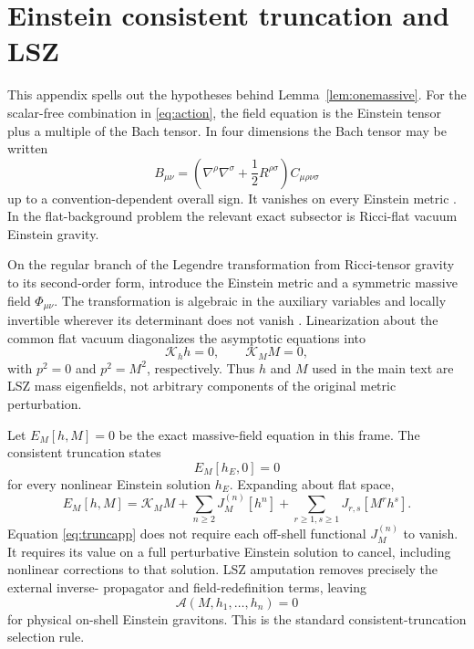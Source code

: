 \documentclass[11pt]{article}
\theoremstyle{definition}
\theoremstyle{remark}
\begin{document}
\appendix

\section{Einstein consistent truncation and LSZ}
\label{app:truncation}

This appendix spells out the hypotheses behind
Lemma~\ref{lem:onemassive}.  For the scalar-free combination in
\eqref{eq:action}, the field equation is the Einstein tensor plus a
multiple of the Bach tensor.  In four dimensions the Bach tensor may be
written
\begin{equation}
B_{\mu\nu}=\left(\nabla^\rho\nabla^\sigma
+\frac12R^{\rho\sigma}\right)C_{\mu\rho\nu\sigma}
\end{equation}
up to a convention-dependent overall sign.  It vanishes on every
Einstein metric \cite{LiuLuPope}.  In the flat-background problem the
relevant exact subsector is Ricci-flat vacuum Einstein gravity.

On the regular branch of the Legendre transformation from Ricci-tensor
gravity to its second-order form, introduce the Einstein metric and a
symmetric massive field $\Phi_{\mu\nu}$.  The transformation is algebraic
in the auxiliary variables and locally invertible wherever its determinant
does not vanish \cite{MagnanoSokolowski}.  Linearization about the common
flat vacuum diagonalizes the asymptotic equations into
\begin{equation}
\mathcal K_hh=0,
\qquad
\mathcal K_MM=0,
\end{equation}
with $p^2=0$ and $p^2=M^2$, respectively.  Thus $h$ and $M$ used in the
main text are LSZ mass eigenfields, not arbitrary components of the
original metric perturbation.

Let $E_M[h,M]=0$ be the exact massive-field equation in this frame.  The
consistent truncation states
\begin{equation}\label{eq:truncapp}
E_M[h_E,0]=0
\end{equation}
for every nonlinear Einstein solution $h_E$.  Expanding about flat space,
\begin{equation}
E_M[h,M]=\mathcal K_MM+
\sum_{n\ge2}J_M^{(n)}[h^n]
+\sum_{r\ge1,s\ge1}J_{r,s}[M^rh^s].
\end{equation}
Equation \eqref{eq:truncapp} does not require each off-shell functional
$J_M^{(n)}$ to vanish.  It requires its value on a full perturbative
Einstein solution to cancel, including nonlinear corrections to that
solution.  LSZ amputation removes precisely the external inverse-
propagator and field-redefinition terms, leaving
\begin{equation}
\mathcal A(M,h_1,\ldots,h_n)=0
\end{equation}
for physical on-shell Einstein gravitons.  This is the standard
consistent-truncation selection rule.
\end{document}

